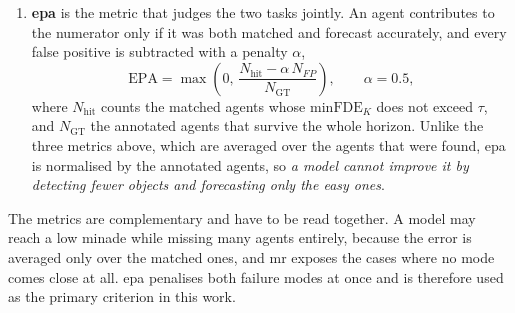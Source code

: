 \begin{enumerate}
    \item \textbf{\Acf{epa}} \cite{Gu2023ViP3D} is the metric that judges the two tasks jointly. An agent
    contributes to the numerator only if it was both matched and forecast accurately, and every false
    positive is subtracted with a penalty \(\alpha\),
    \begin{equation}
        \mathrm{EPA} = \max\left(0,\,
        \frac{N_{\mathrm{hit}} - \alpha\, N_{FP}}{N_{\mathrm{GT}}}\right),
        \qquad \alpha = 0.5,
        \label{eq:epa}
    \end{equation}
    where \(N_{\mathrm{hit}}\) counts the matched agents whose \(\mathrm{minFDE}_K\) does not exceed
    \(\tau\), and \(N_{\mathrm{GT}}\) the annotated agents that survive the whole horizon. Unlike the three
    metrics above, which are averaged over the agents that were found, \acs{epa} is normalised by the
    annotated agents, so \emph{a model cannot improve it by detecting fewer objects
    and forecasting only the easy ones}.
\end{enumerate}

The metrics are complementary and have to be read together. A model may reach a low min\acs{ade} while
missing many agents entirely, because the error is averaged only over the matched ones, and \acs{mr}
exposes the cases where no mode comes close at all. \Acs{epa} penalises both failure modes at once and is
therefore used as the primary criterion in this work. 